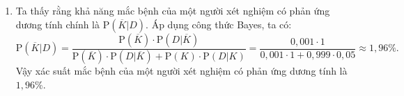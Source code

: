 \begin{bt}
{\begin{enumerate}
\begin{center}
			\end{center}
			\item Ta thấy rằng khả năng mắc bệnh của một người xét nghiệm có phản ứng dương tính chính là $\mathrm{P}\left(\overline{K}|D\right)$. Áp dụng công thức Bayes, ta có:
			\[\mathrm{P}\left(\overline{K}|D\right)=\dfrac{\mathrm{P}\left(\overline{K}\right)\cdot \mathrm{P}\left(D|\overline{K}\right)}{\mathrm{P}\left(\overline{K}\right)\cdot \mathrm{P}\left(D|\overline{K}\right) + \mathrm{P}(K)\cdot\mathrm{P}(D|K)}=\dfrac{0{,}001\cdot 1}{0{,}001\cdot 1 + 0{,}999 \cdot 0{,}05}\approx 1{,}96\%.\]
			Vậy xác suất mắc bệnh của một người xét nghiệm có phản ứng dương tính là $1{,}96\%$.
		\end{enumerate}
	}
\end{bt}

